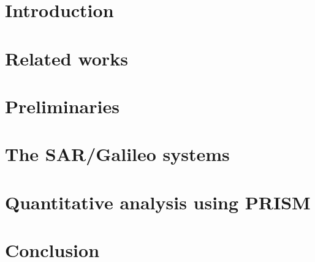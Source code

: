 \documentclass[runningheads]{llncs}
\begin{document}
\section{Introduction}
\label{introduction}
\begin{sloppypar}

\end{sloppypar}

\section{Related works}
\label{works}
\begin{sloppypar}

\end{sloppypar}

\section{Preliminaries}
\label{preliminaries}
\begin{sloppypar}

\end{sloppypar}


\section{The SAR/Galileo  systems}
\label{sattelitemodel}
\begin{sloppypar}

\end{sloppypar}


\section{Quantitative analysis using PRISM}
\label{usecase}
\begin{sloppypar}

\end{sloppypar}

\section{Conclusion}
\label{conclusion}
\begin{sloppypar}

\end{sloppypar}




{\small
}
\end{document}
